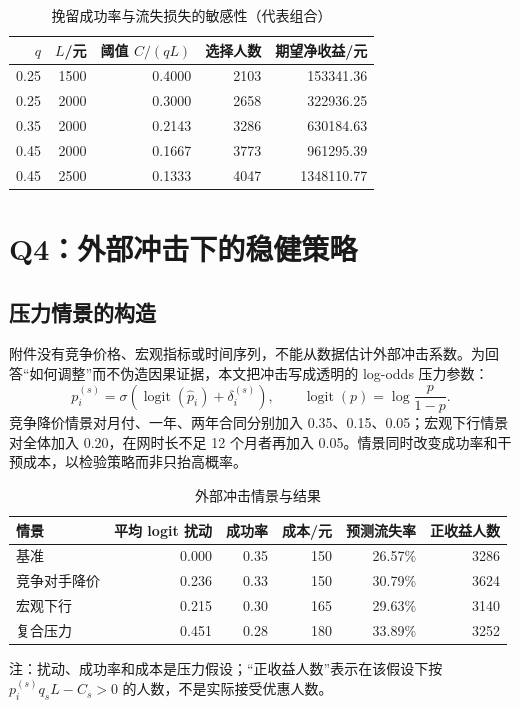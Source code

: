 \documentclass[UTF8,a4paper,11pt]{ctexart}
\DeclareMathOperator{\logit}{logit}
\begin{document}
\begin{table}[H]
\centering
\caption{挽留成功率与流失损失的敏感性（代表组合）}
\label{tab:q3-sensitivity}
\begin{tabular}{@{}rrrrr@{}}
\toprule
\(q\) & \(L\)/元 & 阈值 \(C/(qL)\) & 选择人数 & 期望净收益/元\\
\midrule
0.25 & 1500 & 0.4000 & 2103 & 153341.36\\
0.25 & 2000 & 0.3000 & 2658 & 322936.25\\
0.35 & 2000 & 0.2143 & 3286 & 630184.63\\
0.45 & 2000 & 0.1667 & 3773 & 961295.39\\
0.45 & 2500 & 0.1333 & 4047 & 1348110.77\\
\bottomrule
\end{tabular}
\end{table}

\section{Q4：外部冲击下的稳健策略}\label{sec:q4}

\subsection{压力情景的构造}
附件没有竞争价格、宏观指标或时间序列，不能从数据估计外部冲击系数。为回答“如何调整”而不伪造因果证据，本文把冲击写成透明的 log-odds 压力参数：
\begin{equation}
p_i^{(s)}=\sigma\!\left(\logit(\widehat p_i)+\delta_i^{(s)}\right),
\qquad
\logit(p)=\log\frac{p}{1-p}.
\label{eq:q4-shift}
\end{equation}
竞争降价情景对月付、一年、两年合同分别加入 0.35、0.15、0.05；宏观下行情景对全体加入 0.20，在网时长不足 12 个月者再加入 0.05。情景同时改变成功率和干预成本，以检验策略而非只抬高概率。

\begin{table}[H]
\centering
\caption{外部冲击情景与结果}
\label{tab:q4-scenarios}
\begin{tabular}{@{}lrrrrr@{}}
\toprule
情景 & 平均 logit 扰动 & 成功率 & 成本/元 & 预测流失率 & 正收益人数\\
\midrule
基准 & 0.000 & 0.35 & 150 & 26.57\% & 3286\\
竞争对手降价 & 0.236 & 0.33 & 150 & 30.79\% & 3624\\
宏观下行 & 0.215 & 0.30 & 165 & 29.63\% & 3140\\
复合压力 & 0.451 & 0.28 & 180 & 33.89\% & 3252\\
\bottomrule
\end{tabular}
\begin{tablenotes}
\footnotesize\item 注：扰动、成功率和成本是压力假设；“正收益人数”表示在该假设下按 \(p_i^{(s)}q_sL-C_s>0\) 的人数，不是实际接受优惠人数。
\end{tablenotes}
\end{table}
\end{document}
